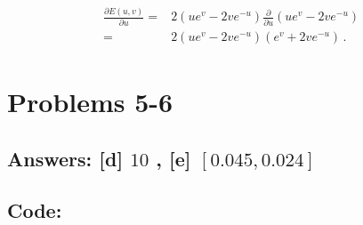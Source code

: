 \documentclass[11pt]{article}
\begin{document}
\begin{align}
\begin{split}
\frac{\partial E(u,v)}{\partial u}=&2(ue^v-2ve^{-u})\frac{\partial}{\partial u}(ue^v-2ve^{-u})\\ =&2(ue^v-2ve^{-u})(e^v+2ve^{-u})\,.
\end{split}
\end{align}

    \hypertarget{problems-5-6}{%
\section{Problems 5-6}\label{problems-5-6}}

\hypertarget{answers-d-10-e-0.0450.024}{%
\subsection{\texorpdfstring{Answers: {[}d{]} \(10\) , {[}e{]}
\([0.045,0.024]\)}{Answers: {[}d{]} 10 , {[}e{]} {[}0.045,0.024{]}}}\label{answers-d-10-e-0.0450.024}}

\hypertarget{code}{%
\subsection{Code:}\label{code}}
\end{document}
